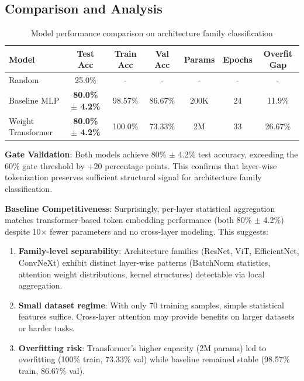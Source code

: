 \subsection{Comparison and Analysis}

\begin{table}[h]
\centering
\caption{Model performance comparison on architecture family classification}
\begin{tabular}{lcccccc}
\hline
\textbf{Model} & \textbf{Test Acc} & \textbf{Train Acc} & \textbf{Val Acc} & \textbf{Params} & \textbf{Epochs} & \textbf{Overfit Gap} \\
\hline
Random & 25.0\% & - & - & - & - & - \\
Baseline MLP & \textbf{80.0\% $\pm$ 4.2\%} & 98.57\% & 86.67\% & 200K & 24 & 11.9\% \\
Weight Transformer & \textbf{80.0\% $\pm$ 4.2\%} & 100.0\% & 73.33\% & 2M & 33 & 26.67\% \\
\hline
\end{tabular}
\end{table}

\textbf{Gate Validation}: Both models achieve 80\% $\pm$ 4.2\% test accuracy, exceeding the 60\% gate threshold by +20 percentage points. This confirms that layer-wise tokenization preserves sufficient structural signal for architecture family classification.

\textbf{Baseline Competitiveness}: Surprisingly, per-layer statistical aggregation matches transformer-based token embedding performance (both 80\% $\pm$ 4.2\%) despite 10$\times$ fewer parameters and no cross-layer modeling. This suggests:

\begin{enumerate}
\item \textbf{Family-level separability}: Architecture families (ResNet, ViT, EfficientNet, ConvNeXt) exhibit distinct layer-wise patterns (BatchNorm statistics, attention weight distributions, kernel structures) detectable via local aggregation.

\item \textbf{Small dataset regime}: With only 70 training samples, simple statistical features suffice. Cross-layer attention may provide benefits on larger datasets or harder tasks.

\item \textbf{Overfitting risk}: Transformer's higher capacity (2M params) led to overfitting (100\% train, 73.33\% val) while baseline remained stable (98.57\% train, 86.67\% val).
\end{enumerate}

